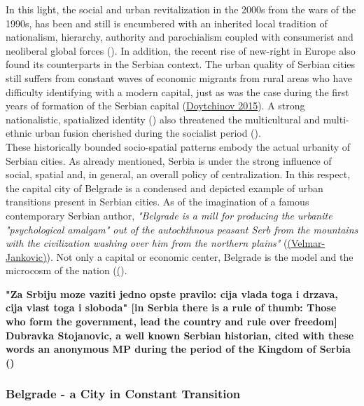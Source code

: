 \documentclass[11pt]{report}
\begin{document}
In this light, the social and urban revitalization in the 2000s from the wars of the 1990s, has been and still is encumbered with an inherited local tradition of nationalism, hierarchy, authority and parochialism coupled with consumerist and neoliberal global forces (\href{Stupar}{\citealt{stupar_aleksandra_recreating_2004}}).
In addition, the recent rise of new-right in Europe also found its counterparts in the Serbian context. The urban quality of Serbian cities still suffers from constant waves of economic migrants from rural areas who have difficulty identifying with a modern capital, just as was the case during the first years of formation of the Serbian capital (\href{ref}{Doytchinov 2015}).
A strong nationalistic, spatialized identity (\href{Savic}{\citealt{savic_where_2014}}) also threatened the multicultural and multi-ethnic urban fusion cherished during the socialist period (\href{Stupar}{\citealt{stupar_aleksandra_recreating_2004}}).
\\

These historically bounded socio-spatial patterns embody the actual urbanity of Serbian cities. As already mentioned, Serbia is under the strong influence of social, spatial and, in general, an overall policy of centralization. In this respect, the capital city of Belgrade is a condensed and depicted example of urban transitions present in Serbian cities. As of the imagination of a famous contemporary Serbian author,  \textit{"Belgrade is a mill for producing the urbanite "psychological amalgam" out of the autochthnous peasant Serb from the mountains with the civilization washing over him from the northern plains"} (\href{Velmar}{(Velmar-Jankovic)}). Not only a capital or economic center, Belgrade is the model and the microcosm of the nation (\href{Zivkovic}{(\citealt{zivkovic_serbian_2011}}).

\textbf{"Za Srbiju moze vaziti jedno opste pravilo: cija vlada toga i drzava, cija vlast toga i sloboda" [in Serbia there is a rule of thumb: Those who form the government, lead the country and rule over freedom] Dubravka Stojanovic, a well known Serbian historian, cited with these words an anonymous MP during the period of the Kingdom of Serbia (\href{Stojanovic}{\citealt{stojanovic_u_2010}})}

\subsubsection{Belgrade - a City in Constant Transition}
\end{document}
